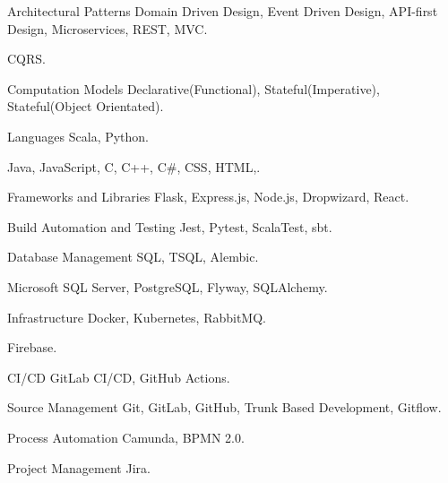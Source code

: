   \begin{cvskills}
    \cvskill
      {Architectural Patterns} 
      { Domain Driven Design, Event Driven Design, API-first Design, Microservices, REST, MVC.}
    
    \cvskill
      {} 
      { CQRS.}
    
    \cvskill
      {Computation Models} 
      { Declarative(Functional), Stateful(Imperative), Stateful(Object Orientated).} 
    
    \cvskill
      {Languages} 
      { Scala, Python.}
    
    \cvskill
      {} 
      { Java, JavaScript, C, C++, C\#, CSS, HTML,.}
    
    \cvskill
      {Frameworks and Libraries} 
      { Flask, Express.js, Node.js, Dropwizard, React.}
        
    \cvskill
      {Build Automation and Testing} 
      { Jest, Pytest, ScalaTest, sbt.} 
    
    \cvskill
      {Database Management} 
      { SQL, TSQL, Alembic.}
    
    \cvskill
      {} 
      { Microsoft SQL Server, PostgreSQL, Flyway, SQLAlchemy.}
    
    \cvskill
      {Infrastructure} 
      { Docker, Kubernetes, RabbitMQ.} 
    
    \cvskill
      {} 
      { Firebase.} 
    
    \cvskill
      {CI/CD} 
      { GitLab CI/CD, GitHub Actions.} 
    
    \cvskill
      {Source Management} 
      { Git, GitLab, GitHub, Trunk Based Development, Gitflow.} 
    
    \cvskill
      {Process Automation}
      { Camunda, BPMN 2.0.}
    
    \cvskill
      {Project Management} 
      { Jira.} 
  \end{cvskills}